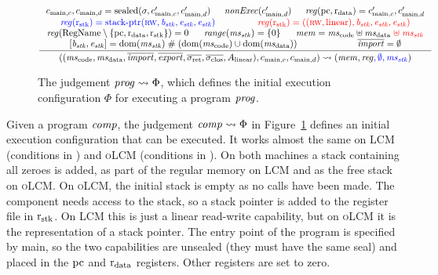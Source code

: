 \documentclass[acmsmall,screen]{acmart}\settopmatter{}
\renewcommand{\RegName}{\shareddom{RegName}}
\renewcommand{\nonExec}[1]{\plainfun{nonExec}{#1}}
\newcommand{\trgcm}{\textsc{LCM}}
\newcommand{\srccm}{\textsc{oLCM}}
\begin{document}
\begin{figure}
  \centering
  \begin{equation*}
    \inference{
      c_{\mathrm{main},c},c_{\mathrm{main},d}  = \sealed{\sigma, c_{\mathrm{main},c}', c_{\mathrm{main},d}'} &
      \nonExec{c_{\mathrm{main},d}'}&
      \reg(\pcreg,\rdata) = c_{\mathrm{main},c}', c_{\mathrm{main},d}' \\
      \src{\reg(\rstk) = \stkptr{\rw,\baddr_\stk,\eaddr_\stk,\eaddr_\stk}} & 
      \trg{\reg(\rstk) = ((\rw,\linear),\baddr_\stk,\eaddr_\stk,\eaddr_\stk)} \\
      \reg(\RegName \setminus \{\pcreg,\rdata,\rstk\}) = 0&
      \range{\ms_\stk} = \{0\}&
      \mem = \mscode \uplus \msdata \trg{\;\uplus\; \ms_\stk} \\
      [\baddr_\stk,\eaddr_\stk] = \dom(\ms_\stk ) \mathrel{\#} (\dom(\mscode) \cup \dom(\msdata)) &
      \overline{\var{import}} = \emptyset
    }{
      ((\mscode, \msdata, \overline{\var{import}}, \overline{\var{export}}, \sigrets, \sigcloss,A_\linear),  c_{\mathrm{main},c}, c_{\mathrm{main},d}) \rightsquigarrow (\mem, \reg\src{, \emptyset, \ms_\stk})
    }
  \end{equation*}
  \caption{The judgement $\mathit{prog} \rightsquigarrow \Phi$, which defines the initial execution configuration $\Phi$ for executing a program $\mathit{prog}$.}
  \label{fig:init-ec}
\end{figure}

Given a program $\mathit{comp}$, the judgement $\mathit{comp} \rightsquigarrow \Phi$ in Figure~\ref{fig:init-ec} defines an initial execution configuration that can be executed.
It works almost the same on \trgcm{} (conditions in ) and \srccm{} (conditions in ).
On both machines a stack containing all zeroes is added, as part of the regular memory on \trgcm{} and as the free stack on \srccm{}.
On \srccm{}, the initial stack is empty as no calls have been made.
The component needs access to the stack, so a stack pointer is added to the register file in $\mathrm{r}_\mathrm{stk}$.
On \trgcm{} this is just a linear read-write capability, but on \srccm{} it is the representation of a stack pointer.
The entry point of the program is specified by main, so the two capabilities are unsealed (they must have the same seal) and placed in the $\mathrm{pc}$ and $\mathrm{r}_\mathrm{data}$ registers.
Other registers are set to zero.
\end{document}
